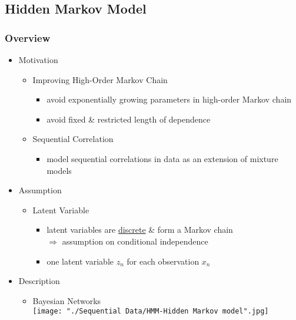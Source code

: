 \subsection{Hidden Markov Model}
\subsubsection{Overview}
\begin{itemize}
\item Motivation
	\begin{itemize}
	\item Improving High-Order Markov Chain
		\begin{itemize}
		\item avoid exponentially growing parameters in high-order Markov chain
		\item avoid fixed \& restricted length of dependence
		\end{itemize}
	\item Sequential Correlation
		\begin{itemize}
		\item model sequential correlations in data as an extension of mixture models
		\end{itemize}
	\end{itemize}
\item Assumption
	\begin{itemize}
	\item Latent Variable
		\begin{itemize}
		\item latent variables are \underline{discrete} \& form a Markov chain \\
		$\Rightarrow$ assumption on conditional independence
		\item one latent variable $z_n$ for each observation $x_n$
		\end{itemize}
	\end{itemize}
\item Description
	\begin{itemize}
	\item Bayesian Networks \\
	\texttt{[image: "./Sequential Data/HMM-Hidden Markov model".jpg]}
	

\end{itemize}
\end{itemize}
